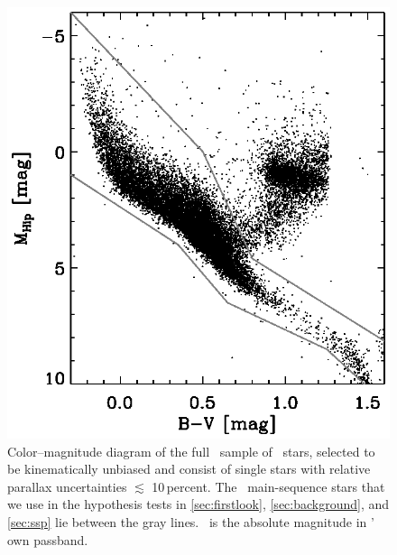 \clearpage
\begin{figure}
\begin{center}
\includegraphics[]{figs_groups/cmd.ps}
\end{center}
\caption[Color--magnitude diagram of the full \Hipparcos\ sample of
  \nstars\ stars]{Color--magnitude diagram of the full \Hipparcos\
  sample of \nstars\ stars, selected to be kinematically unbiased and
  consist of single stars with relative parallax uncertainties
  $\lesssim$ 10\,percent. The \nstarsms\ main-sequence stars that we
  use in the hypothesis tests in \sectionname \sectionname
  \ref{sec:firstlook}, \ref{sec:background}, and \ref{sec:ssp} lie
  between the gray lines.  \mhip\ is the absolute magnitude in
  \Hipparcos' own passband.}\label{fig:cmd}
\end{figure}


